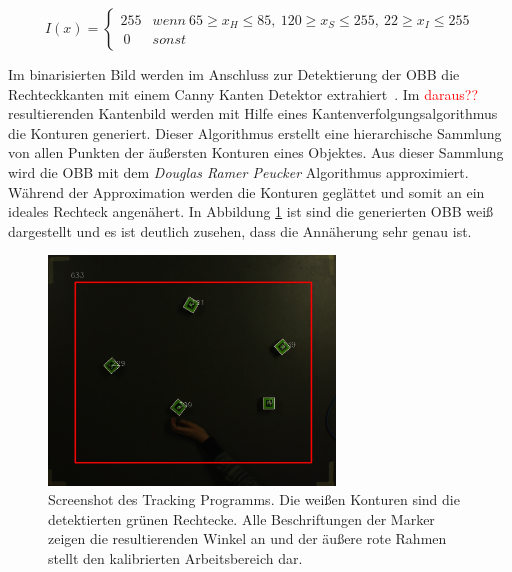 \begin{equation}
\label{equ:Threshold}
I(x) = \begin{cases}
255 & wenn \ 65 \ge x_H \le 85, \ 120 \ge x_S \le 255, \ 22 \ge x_I \le 255\\\
0 & sonst
\end{cases}
\end{equation}

Im binarisierten Bild werden im Anschluss zur Detektierung der OBB die Rechteckkanten mit einem Canny Kanten Detektor extrahiert~\cite{article:Canny}. Im \textcolor{red}{daraus??} resultierenden Kantenbild werden mit Hilfe eines Kantenverfolgungsalgorithmus \cite{article:FindConturs} die Konturen generiert. Dieser Algorithmus erstellt eine hierarchische Sammlung von allen Punkten der äußersten Konturen eines Objektes. Aus dieser Sammlung wird die OBB mit dem \textit{Douglas Ramer Peucker} Algorithmus \cite{article:RamerPeucker} approximiert. Während der Approximation werden die Konturen geglättet und somit an ein ideales Rechteck angenähert. In Abbildung \ref{fig:DebugScreenshot} ist sind die generierten OBB weiß dargestellt und es ist deutlich zusehen, dass die Annäherung sehr genau ist.
\begin{figure}[H]
	\centering
	\includegraphics[width=3in]{Bilder/TrackingScreenshot_x.jpg}
	\caption{Screenshot des Tracking Programms. Die weißen Konturen sind die detektierten grünen Rechtecke. Alle Beschriftungen der Marker zeigen die resultierenden Winkel an und der äußere rote Rahmen stellt den kalibrierten Arbeitsbereich dar.}

	\label{fig:DebugScreenshot}
\end{figure}

